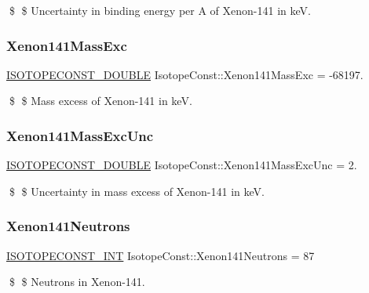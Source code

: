 \$ \$ Uncertainty in binding energy per A of Xenon-\/141 in keV. \mbox{\label{group___isotope_const-_xenon-_xe141_gaea799a176ed0c991cf1884f813ae9974}} 
\subsubsection{\texorpdfstring{Xenon141\+Mass\+Exc}{Xenon141MassExc}}
{\footnotesize\ttfamily \mbox{\hyperlink{group___isotope_const-_macros_ga8f45a7272ce02c0b4c65c44636ed719a}{I\+S\+O\+T\+O\+P\+E\+C\+O\+N\+S\+T\+\_\+\+D\+O\+U\+B\+LE}} Isotope\+Const\+::\+Xenon141\+Mass\+Exc = -\/68197.}

\$ \$ Mass excess of Xenon-\/141 in keV. \mbox{\label{group___isotope_const-_xenon-_xe141_gaf9de3b0c0b1c4a9070eb8d03626bd6a5}} 
\subsubsection{\texorpdfstring{Xenon141\+Mass\+Exc\+Unc}{Xenon141MassExcUnc}}
{\footnotesize\ttfamily \mbox{\hyperlink{group___isotope_const-_macros_ga8f45a7272ce02c0b4c65c44636ed719a}{I\+S\+O\+T\+O\+P\+E\+C\+O\+N\+S\+T\+\_\+\+D\+O\+U\+B\+LE}} Isotope\+Const\+::\+Xenon141\+Mass\+Exc\+Unc = 2.}

\$ \$ Uncertainty in mass excess of Xenon-\/141 in keV. \mbox{\label{group___isotope_const-_xenon-_xe141_gafd922eaf5218aaef4460de27717375a7}} 
\subsubsection{\texorpdfstring{Xenon141\+Neutrons}{Xenon141Neutrons}}
{\footnotesize\ttfamily \mbox{\hyperlink{group___isotope_const-_macros_ga5f18360b3e99483a35c32d789e62621c}{I\+S\+O\+T\+O\+P\+E\+C\+O\+N\+S\+T\+\_\+\+I\+NT}} Isotope\+Const\+::\+Xenon141\+Neutrons = 87}

\$ \$ Neutrons in Xenon-\/141. \mbox{\label{group___isotope_const-_xenon-_xe141_gac4a51ce47cf10a08811e15eefdd35747}} 

